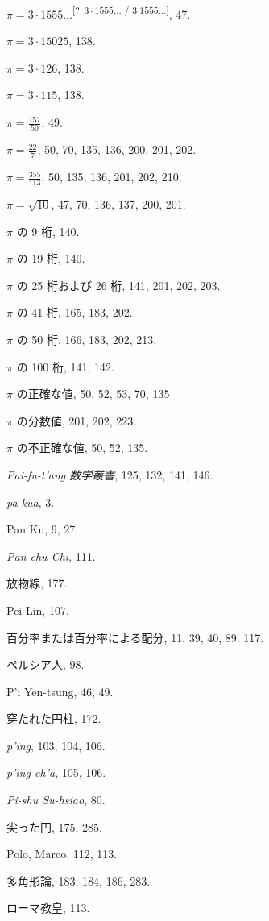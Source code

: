\documentclass[11pt]{article}
\newcommand{\unclear}[1]{\textsuperscript{[?~#1]}}
\begin{document}
$\pi = 3\cdot 1555\ldots$\unclear{$3\cdot 1555\ldots$ / $3\;1555\ldots$}, 47.\par
$\pi = 3\cdot 15025$, 138.\par
$\pi = 3\cdot 126$, 138.\par
$\pi = 3\cdot 115$, 138.\par
$\pi = \frac{157}{50}$, 49.\par
$\pi = \frac{22}{7}$, 50, 70, 135, 136, 200, 201, 202.\par
$\pi = \frac{355}{113}$, 50, 135, 136, 201, 202, 210.\par
$\pi = \sqrt{10}$, 47, 70, 136, 137, 200, 201.\par
$\pi$ の 9 桁, 140.\par
$\pi$ の 19 桁, 140.\par
$\pi$ の 25 桁および 26 桁, 141, 201, 202, 203.\par
$\pi$ の 41 桁, 165, 183, 202.\par
$\pi$ の 50 桁, 166, 183, 202, 213.\par
$\pi$ の 100 桁, 141, 142.\par
$\pi$ の正確な値, 50, 52, 53, 70, 135\par
$\pi$ の分数値, 201, 202, 223.\par
$\pi$ の不正確な値, 50, 52, 135.\par
\emph{Pai-fu-t'ang 数学叢書}, 125, 132, 141, 146.\par
\emph{pa-kua}, 3.\par
Pan Ku, 9, 27.\par
\emph{Pan-chu Chi}, 111.\par
放物線, 177.\par
Pei Lin, 107.\par
百分率または百分率による配分, 11, 39, 40, 89. 117.\par
ペルシア人, 98.\par
P'i Yen-tsung, 46, 49.\par
穿たれた円柱, 172.\par
\emph{p'ing}, 103, 104, 106.\par
\emph{p'ing-ch'a}, 105, 106.\par
\emph{Pi-shu Su-hsiao}, 80.\par
尖った円, 175, 285.\par
Polo, Marco, 112, 113.\par
多角形論, 183, 184, 186, 283.\par
ローマ教皇, 113.\par
\end{document}
